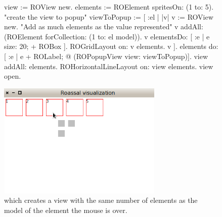 \documentclass[a4paper,10pt,twoside]{book}
\begin{document}
\begin{figure}[H]
      \begin{minipage}[t]{1\textwidth}
      \vspace{0pt}
     \begin{code}{}
view := ROView new.
elements := ROElement spritesOn: (1 to: 5).
"create the view to popup"
viewToPopup := [ :el | |v| 
	              	              v := ROView new.
	              	              "Add as much elements as the value represented"
	              	              v addAll: (ROElement forCollection: (1 to: el model)).
	              	              v elementsDo: [ :e | e size: 20; + ROBox ].
	              	              ROGridLayout on: v elements.
	              	              v ].
elements do: [ :e | e + ROLabel;  @ (ROPopupView view: viewToPopup)].
view addAll: elements.
ROHorizontalLineLayout on: view elements.
view open.
\end{code}
\end{minipage}\hfill\begin{minipage}[t]{1\textwidth}
	 \vspace{0pt} \raggedright
       \centering
		\includegraphics[width=0.7\textwidth]{popupView2}
   \end{minipage}
\label{fig:popupView}
\caption{ which creates a view with the same number of elements as the model of the element the mouse is over.}
\end{figure} 


%
%	
\end{document}
